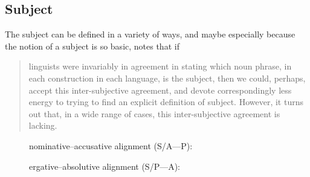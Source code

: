 \subsection{Subject}

The subject can be defined in a variety of ways, and maybe especially because
the notion of a subject is so basic, \citet{comrie1989} notes that if

\blockcquote[104]{comrie1989}{linguists were invariably in agreement in stating
which noun phrase, in each construction in each language, is the subject, then
we could, perhaps, accept this inter-subjective agreement, and devote
correspondingly less energy to trying to find an explicit definition of
subject. However, it turns out that, in a wide range of cases, this
inter-subjective agreement is lacking.}

\begin{figure}[t]
\pex\label{ex:subject}
\a\label{ex:subject_nomacc}%
nominative--accusative alignment (S/A---P):\medskip


\a\label{ex:subject_ergabs}%
ergative--absolutive alignment (S/P---A):\medskip


\xe
\end{figure}

